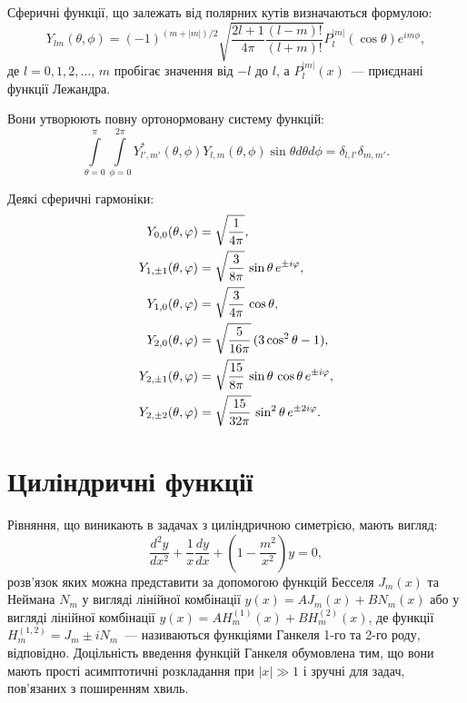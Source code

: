 Сферичні функції, що залежать від полярних кутів визначаються формулою:
\begin{equation*}
    Y_{lm}(\theta,\phi) = (-1)^{(m+|m|)/2} \sqrt{\frac{2l+1}{4\pi}\frac{(l-m)!}{(l+m)!}}P_l^{|m|}(\cos \theta) e^{im\phi},
\end{equation*}
де $l = 0,1,2, \ldots$, $m$ пробігає значення від $-l$ до $l$, а $P_l^{|m|}(x)$~--- приєднані функції Лежандра.

Вони утворюють повну ортонормовану систему функцій:
\[
    \int\limits_{\theta=0}^{\pi} \int\limits_{\phi=0}^{2\pi} Y^*_{l',m'}(\theta, \phi) Y_{l,m}(\theta, \phi) \sin\theta d\theta d\phi  = \delta_{l,l'} \delta_{m,m'}.
\] 

Деякі сферичні гармоніки:
\begin{align*}
	Y_{0,0}(\theta,\phi)     & =\sqrt{1\over 4\pi},                                            \\
	Y_{1,\pm 1}(\theta,\phi) & =\sqrt{3\over 8\pi} \, \sin\theta \, e^{\pm i\phi},             \\
	Y_{1,0}(\theta,\phi)     & =\sqrt{3\over 4\pi}\, \cos\theta ,                              \\
	Y_{2,0}(\theta,\phi)     & =\sqrt{5\over 16\pi}\, (3\cos^{2}\theta-1),                     \\
	Y_{2,\pm 1}(\theta,\phi) & =\sqrt{15\over 8\pi}\, \sin\theta\, \cos\theta\, e^{\pm i\phi}, \\
	Y_{2,\pm 2}(\theta,\phi) & =\sqrt{15\over 32\pi} \, \sin^{2}\theta \, e^{\pm2i\phi}.
\end{align*}

\section{Циліндричні функції}\setcounter{equation}{0}

Рівняння, що виникають в задачах з циліндричною симетрією, мають вигляд:
	\begin{equation}\label{eq:Bessel_eq}
		\frac{d^2y}{dx^2} + \frac1x\frac{dy}{dx} + \left(1 - \frac{m^2}{x^2} \right) y = 0,
	\end{equation}
	розв'язок яких можна представити за допомогою функцій Бесселя $J_m(x)$ та Неймана $N_m$ у вигляді лінійної комбінації $y(x) = A J_m(x) + B N_m(x)$ або у вигляді лінійної комбінації $y(x) = A H^{(1)}_m(x) + B H^{(2)}_m(x)$, де функції $H_m^{(1,2)} =J_m \pm i N_m$~--- називаються функціями Ганкеля 1-го та 2-го роду, відповідно. Доцільність введення функцій Ганкеля обумовлена тим, що вони мають прості асимптотичні розкладання при $|x| \gg 1$ і зручні для задач, пов'язаних з поширенням хвиль. 

